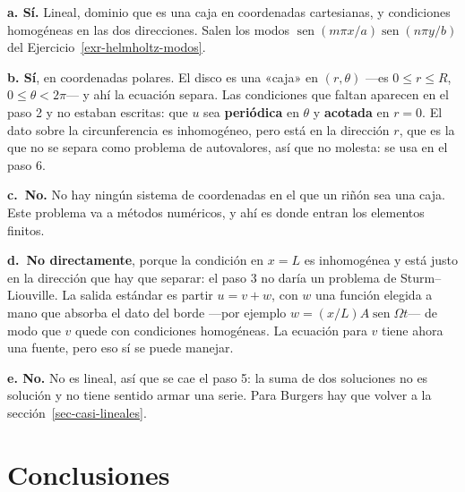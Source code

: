 \documentclass[
  spanish,
  a4paper,
]{scrbook}
\theoremstyle{definition}
\theoremstyle{plain}
\theoremstyle{definition}
\theoremstyle{plain}
\theoremstyle{definition}
\theoremstyle{remark}
\begin{document}
\begin{tcolorbox}[enhanced jigsaw, arc=.35mm, bottomrule=.15mm, bottomtitle=1mm, breakable, colback=white, colbacktitle=quarto-callout-tip-color!10!white, colframe=quarto-callout-tip-color-frame, coltitle=black, left=2mm, leftrule=.75mm, opacityback=0, opacitybacktitle=0.6, rightrule=.15mm, title=\textcolor{quarto-callout-tip-color}{\faLightbulb}\hspace{0.5em}{Solución}, titlerule=0mm, toprule=.15mm, toptitle=1mm]

\textbf{a. Sí.} Lineal, dominio que es una caja en coordenadas
cartesianas, y condiciones homogéneas en las dos direcciones. Salen los
modos \(\operatorname{sen}(m\pi x/a)\operatorname{sen}(n\pi y/b)\) del
Ejercicio~\ref{exr-helmholtz-modos}.

\textbf{b. Sí}, en coordenadas polares. El disco es una «caja» en
\((r,\theta)\) ---es \(0\le r\le R\), \(0\le\theta<2\pi\)--- y ahí la
ecuación separa. Las condiciones que faltan aparecen en el paso 2 y no
estaban escritas: que \(u\) sea \textbf{periódica} en \(\theta\) y
\textbf{acotada} en \(r=0\). El dato sobre la circunferencia es
inhomogéneo, pero está en la dirección \(r\), que es la que no se separa
como problema de autovalores, así que no molesta: se usa en el paso 6.

\textbf{c.~No.} No hay ningún sistema de coordenadas en el que un riñón
sea una caja. Este problema va a métodos numéricos, y ahí es donde
entran los elementos finitos.

\textbf{d.~No directamente}, porque la condición en \(x=L\) es
inhomogénea y está justo en la dirección que hay que separar: el paso 3
no daría un problema de Sturm--Liouville. La salida estándar es partir
\(u = v + w\), con \(w\) una función elegida a mano que absorba el dato
del borde ---por ejemplo \(w = (x/L)A\operatorname{sen}\Omega t\)--- de
modo que \(v\) quede con condiciones homogéneas. La ecuación para \(v\)
tiene ahora una fuente, pero eso sí se puede manejar.

\textbf{e. No.} No es lineal, así que se cae el paso 5: la suma de dos
soluciones no es solución y no tiene sentido armar una serie. Para
Burgers hay que volver a la sección~\ref{sec-casi-lineales}.

\end{tcolorbox}

\section{Conclusiones}\label{sec-conclusiones}
\end{document}
